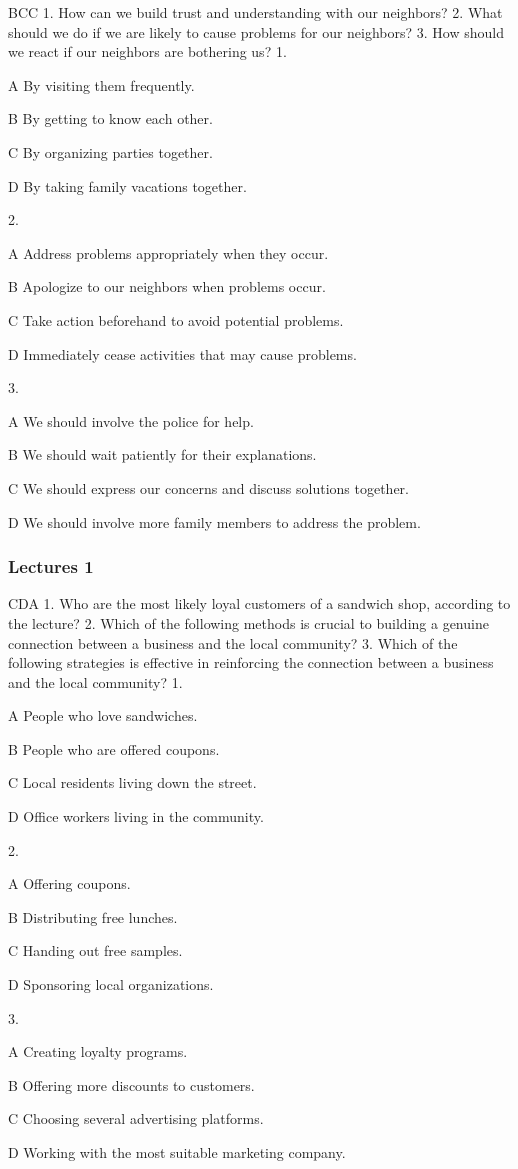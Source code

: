 \begin{enumerate}
	BCC
	1. How can we build trust and understanding with our neighbors?
	2. What should we do if we are likely to cause problems for our neighbors?
	3. How should we react if our neighbors are bothering us?
	1.
	
	A
	By visiting them frequently.
	
	B
	By getting to know each other.
	
	C
	By organizing parties together.
	
	D
	By taking family vacations together.
	
	2.
	
	A
	Address problems appropriately when they occur.
	
	B
	Apologize to our neighbors when problems occur.
	
	C
	Take action beforehand to avoid potential problems.
	
	D
	Immediately cease activities that may cause problems.
	
	3.
	
	A
	We should involve the police for help.
	
	B
	We should wait patiently for their explanations.
	
	C
	We should express our concerns and discuss solutions together.
	
	D
	We should involve more family members to address the problem.
\end{enumerate}

\subsubsection{Lectures 1}

\begin{enumerate}
	CDA
	1. Who are the most likely loyal customers of a sandwich shop, according to the lecture?
	2. Which of the following methods is crucial to building a genuine connection between a business and the local community?
	3. Which of the following strategies is effective in reinforcing the connection between a business and the local community?
	1.
	
	A
	People who love sandwiches.
	
	B
	People who are offered coupons.
	
	C
	Local residents living down the street.
	
	D
	Office workers living in the community.
	
	2.
	
	A
	Offering coupons.
	
	B
	Distributing free lunches.
	
	C
	Handing out free samples.
	
	D
	Sponsoring local organizations.
	
	3.
	
	A
	Creating loyalty programs.
	
	B
	Offering more discounts to customers.
	
	C
	Choosing several advertising platforms.
	
	D
	Working with the most suitable marketing company.
\end{enumerate}


